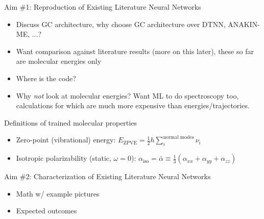 \documentclass[xetex,compress]{beamer}
\begin{document}
\begin{frame}{Aim \#1: Reproduction of Existing Literature Neural Networks}
  \begin{itemize}
  \item Discuss GC architecture, why choose GC architecture over DTNN, ANAKIN-ME, ...?
  \item Want comparison against literature results (more on this later), these so far are molecular energies only
  \item Where is the code?
  \item Why \emph{not} look at molecular energies? Want ML to do spectroscopy too, calculations for which are much more expensive than energies/trajectories.
  \end{itemize}
\end{frame}

\begin{frame}{Definitions of trained molecular properties}
  \begin{itemize}
  \item Zero-point (vibrational) energy: \(E_{\text{ZPVE}} = \frac{1}{2} h \sum_{i}^{\text{normal modes}} \nu_{i}\)
  \item Isotropic polarizability (static, \(\omega = 0\)): \(\alpha_{\text{iso}} = \bar{\alpha} \equiv \frac{1}{3} (\alpha_{xx} + \alpha_{yy} + \alpha_{zz})\)
  \end{itemize}
\end{frame}

\begin{frame}{Aim \#2: Characterization of Existing Literature Neural Networks}
  \begin{itemize}
  \item Math w/ example pictures
  \item Expected outcomes
  \end{itemize}
\end{frame}
\end{document}

